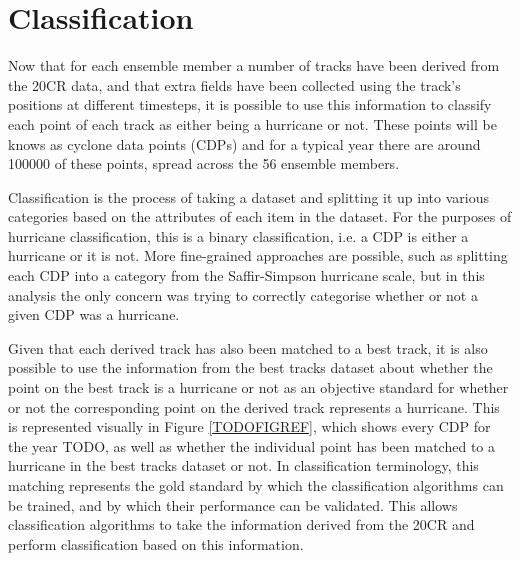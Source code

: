 \documentclass[pdftex,12pt,a4paper]{report}
\begin{document}



\section{Classification}


Now that for each ensemble member a number of tracks have been derived from the 20CR data, and that
extra fields have been collected using the track's positions at different timesteps, it is possible
to use this information to classify each point of each track as either being a hurricane or not.
These points will be knows as cyclone data points (CDPs) and for a typical year there are around
100000 of these points, spread across the 56 ensemble members.

Classification is the process of taking a dataset and splitting it up into various categories based
on the attributes of each item in the dataset. For the purposes of hurricane classification, this is
a binary classification, i.e. a CDP is either a hurricane or it is not. More fine-grained approaches
are possible, such as splitting each CDP into a category from the Saffir-Simpson hurricane scale,
but in this analysis the only concern was trying to correctly categorise whether or not a given CDP
was a hurricane.

Given that each derived track has also been matched to a best track, it is also possible to use the
information from the best tracks dataset about whether the point on the best track is a hurricane or
not as an objective standard for whether or not the corresponding point on the derived track
represents a hurricane. This is represented visually in Figure \ref{TODOFIGREF}, which shows every
CDP for the year TODO, as well as whether the individual point has been matched to a hurricane in
the best tracks dataset or not. In classification terminology, this matching represents the gold
standard by which the classification algorithms can be trained, and by which their performance can
be validated.  This allows classification algorithms to take the information derived from the 20CR
and perform classification based on this information.
\end{document}

